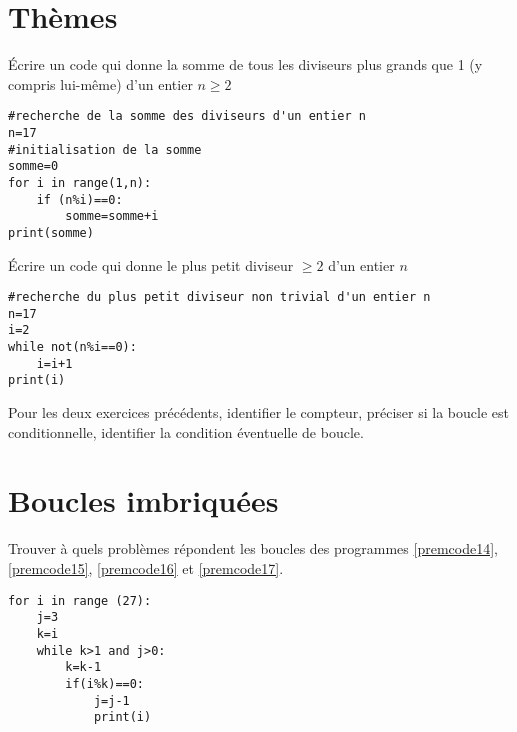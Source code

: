\section{Thèmes}
\begin{Exercise}[counter={exo},label=sommediv] Écrire un code qui donne la somme de tous les diviseurs plus grands que 1 (y compris lui-même) d'un entier $n\geq2$
\end{Exercise}

\begin{Answer}[ref=sommediv]
\begin{lstlisting}[frame=lines, caption={somme des diviseurs},label=premcode12]
#recherche de la somme des diviseurs d'un entier n
n=17
#initialisation de la somme
somme=0
for i in range(1,n):
	if (n%i)==0:
		somme=somme+i
print(somme)
\end{lstlisting} 
\end{Answer}

\begin{Exercise}[counter={exo},label=ppd] Écrire un code qui donne le plus petit diviseur $\geq2$ d'un entier $n$
\end{Exercise}

\begin{Answer}[ref=ppd]
\begin{lstlisting}[frame=lines, caption={plus petit diviseur},label=premcode13]
#recherche du plus petit diviseur non trivial d'un entier n
n=17
i=2
while not(n%i==0):
	i=i+1
print(i)
\end{lstlisting} 
\end{Answer}

\begin{Exercise}[title={analyse},counter={exo}]
  Pour les deux exercices précédents, identifier le compteur, préciser si la boucle est conditionnelle, identifier la condition éventuelle de boucle.\\
 \end{Exercise}
 
\section{Boucles imbriquées}

Trouver à quels problèmes répondent les boucles des programmes \ref{premcode14}, \ref{premcode15}, \ref{premcode16} et \ref{premcode17}. 


\begin{lstlisting}[frame=lines, caption={ boucles imbriquées}, label=premcode14]
for i in range (27):
    j=3
	k=i
	while k>1 and j>0:
		k=k-1
		if(i%k)==0:
			j=j-1
			print(i)		
\end{lstlisting}


